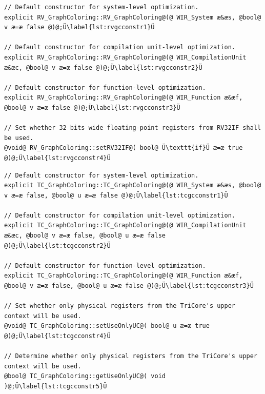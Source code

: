 \begin{lstlisting}[style=code,float=!t,caption={Public Interface of RISC-V Register Allocator from Class \texttt{RV\_GraphColoring}},label=lst:rvgcconstr]
// Default constructor for system-level optimization.
explicit RV_GraphColoring::RV_GraphColoring@(@ WIR_System æ&æs, @bool@ v æ=æ false @)@;Ü\label{lst:rvgcconstr1}Ü

// Default constructor for compilation unit-level optimization.
explicit RV_GraphColoring::RV_GraphColoring@(@ WIR_CompilationUnit æ&æc, @bool@ v æ=æ false @)@;Ü\label{lst:rvgcconstr2}Ü

// Default constructor for function-level optimization.
explicit RV_GraphColoring::RV_GraphColoring@(@ WIR_Function æ&æf, @bool@ v æ=æ false @)@;Ü\label{lst:rvgcconstr3}Ü

// Set whether 32 bits wide floating-point registers from RV32IF shall be used.
@void@ RV_GraphColoring::setRV32IF@( bool@ Ü\texttt{if}Ü æ=æ true @)@;Ü\label{lst:rvgcconstr4}Ü
\end{lstlisting}

\begin{lstlisting}[style=code,float=!b,caption={Public Interface of TriCore Register Allocator from Class \texttt{TC\_GraphColoring}},label=lst:tcgcconstr]
// Default constructor for system-level optimization.
explicit TC_GraphColoring::TC_GraphColoring@(@ WIR_System æ&æs, @bool@ v æ=æ false, @bool@ u æ=æ false @)@;Ü\label{lst:tcgcconstr1}Ü

// Default constructor for compilation unit-level optimization.
explicit TC_GraphColoring::TC_GraphColoring@(@ WIR_CompilationUnit æ&æc, @bool@ v æ=æ false, @bool@ u æ=æ false @)@;Ü\label{lst:tcgcconstr2}Ü

// Default constructor for function-level optimization.
explicit TC_GraphColoring::TC_GraphColoring@(@ WIR_Function æ&æf, @bool@ v æ=æ false, @bool@ u æ=æ false @)@;Ü\label{lst:tcgcconstr3}Ü

// Set whether only physical registers from the TriCore's upper context will be used.
@void@ TC_GraphColoring::setUseOnlyUC@( bool@ u æ=æ true @)@;Ü\label{lst:tcgcconstr4}Ü

// Determine whether only physical registers from the TriCore's upper context will be used.
@bool@ TC_GraphColoring::getUseOnlyUC@( void )@;Ü\label{lst:tcgcconstr5}Ü
\end{lstlisting}

